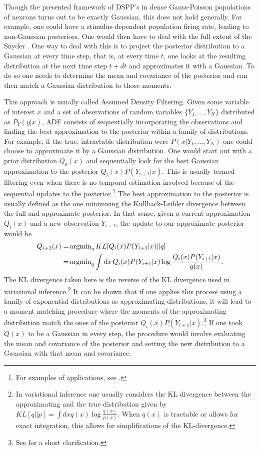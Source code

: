 {\label{sec:ADF}

Though the presented framework of DSPP's in dense Gauss-Poisson populations of neurons turns out to be exactly Gaussian, this does not hold generally. For example,
one could have a stimulus-dependent population firing rate, leading to non-Gaussian posteriors. One would
then have to deal with the full extent of the Snyder . One way to deal with this is to project the posterior distribution to a Gaussian at every time step, that is, at every time
$t$, one looks at the resulting distribution at the next time step $t+dt$ and approximates it with a Gaussian. To do
so one needs to determine the mean and covariance of the posterior and can then match a Gaussian distribution to those moments. 
\par

This approach is usually called Assumed Density Filtering. Given some variable of interest $x$ and a set of observations of random 
variables $\{Y_1,\ldots, Y_N\}$ distributed as $P_Y(y|x)$, ADF consists of sequentially incorporating the observations and
finding the best approximation to the posterior within a family of distributions. For example, if the true, intractable distribution were $P(x|Y_1,\ldots,Y_N)$ one
could choose to approximate it by a Gaussian distribution. One would start out with a prior distribution $Q_0(x)$ and sequentially look
for the best Gaussian approximation to the posterior $Q_i(x) P(Y_{i+1}|x)$. This is usually termed filtering even when there is no temporal estimation
involved because of the sequential updates to the posterior.\footnote{For examples of applications, see .} The best
approximation to the posterior is usually defined as the one minimising the Kullback-Leibler divergence between the full and approximate posterior. In that sense,
given a current approximation $Q_i(x)$ and a new observation $Y_{i+1}$, the update to our approximate posterior would be
\begin{align*}
Q_{i+1} (x) =& \operatorname{argmin}_q KL[Q_i(x) P(Y_{i+1}|x)||q] \\=& \operatorname{argmin}_q \int dx\, Q_i(x) P(Y_{i+1}|x) \log \frac{Q_i(x) P(Y_{i+1}|x)}{q(x)}.
\end{align*}
The KL divergence taken here is the reverse of the KL divergence used in variational inference.\footnote{In variational inference one usually considers
the KL divergence between the approximating and the true distribution given by $KL[q||p] = \int dx q(x) \log\frac{q(x)}{p(x)}$. When $q(x)$ is tractable or allows for
exact integration, this allows for simplifications of the KL-divergence.} It can be shown that if one applies this 
process using a family of exponential distributions as approximating distributions, it will lead
to a moment matching procedure where the moments of the approximating distribution match the ones of the posterior $Q_i(x) P(Y_{i+1}|x)$.\footnote{See  for a 
short 
clarification.} If one took $Q(x)$ to be a Gaussian in every step, the procedure would involve evaluating the mean and covariance of the posterior and setting the new distribution to a 
Gaussian with that mean and covariance.
\par

}
